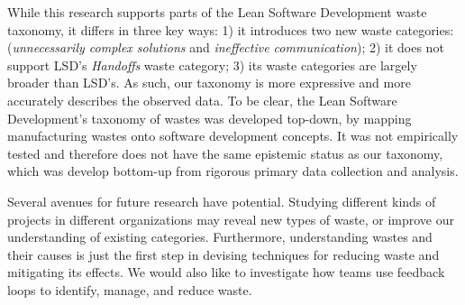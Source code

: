 While this research supports parts of the Lean Software Development waste taxonomy, it differs in three key ways: 1) it introduces two new waste categories: (\textit{unnecessarily complex solutions} and \textit{ineffective communication}); 2) it does not support LSD's \textit{Handoffs} waste category; 3) its waste categories are largely broader than LSD's. As such, our taxonomy is more expressive and more accurately describes the observed data. To be clear, the Lean Software Development's taxonomy of wastes was developed top-down, by mapping manufacturing wastes onto software development concepts. It was not empirically tested and therefore does not have the same epistemic status as our taxonomy, which was develop bottom-up from rigorous primary data collection and analysis. 

Several avenues for future research have potential. Studying different kinds of projects in different organizations may reveal new types of waste, or improve our understanding of existing categories. Furthermore, understanding wastes and their causes is just the first step in devising techniques for reducing waste and mitigating its effects. We would also like to investigate how teams use feedback loops to identify, manage, and reduce waste. 





